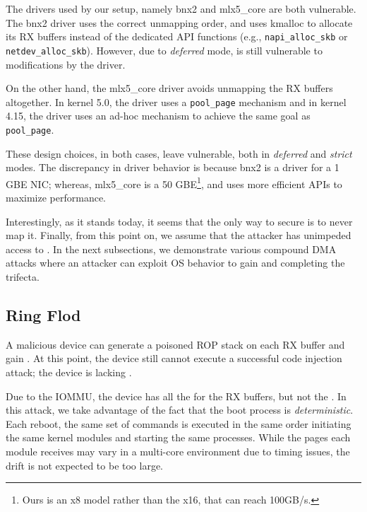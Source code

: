 The drivers used by our setup, namely bnx2 and mlx5\_core are both vulnerable. The bnx2 driver uses the correct unmapping order, and uses kmalloc to allocate its RX buffers instead of the dedicated API functions (e.g., \texttt{napi\_alloc\_skb} or \texttt{netdev\_alloc\_skb}). However, due to \emph{deferred} mode, \shinfo{} is still vulnerable to modifications by the driver.

On the other hand, the mlx5\_core driver avoids unmapping the RX buffers altogether. In kernel 5.0, the driver uses a \texttt{pool\_page} mechanism\cite{page_pool} and in kernel 4.15, the driver uses an ad-hoc mechanism to achieve the same goal as \texttt{pool\_page}. 

These design choices, in both cases, leave \shinfo{} vulnerable, both in \emph{deferred} and \emph{strict} modes.  
The discrepancy in driver behavior is because bnx2 is a driver for a 1 GBE NIC; whereas, mlx5\_core is a 50 GBE\footnote{Ours is an x8 model rather than the x16, that can reach 100GB/s.}, and uses more efficient APIs to maximize performance.

\smallskip
Interestingly, as it stands today, it seems that the only way to secure \shinfo{} is to never map it. Finally, from this point on, we assume that the attacker has unimpeded access to \oportunity{}. In the next subsections, we demonstrate various compound DMA attacks where an attacker can exploit OS behavior  to gain \means{} and \motivation{} completing the trifecta.

\subsection{Ring Flod}\label{sec:ringflod}

A malicious device can generate a poisoned ROP stack on each RX buffer and gain \motivation{}. At this point, the device still cannot execute a successful code injection attack; the device is lacking \means{}. 

Due to the IOMMU, the device has all the \iova{} for the RX buffers, but not the \kva{}. In this attack, we take advantage of the fact that the boot process is \emph{deterministic}. Each reboot, the same set of commands is executed in the same order initiating the same kernel modules and starting the same processes. While the pages each module receives may vary in a multi-core environment due to timing issues, the drift is not expected to be too large. 

